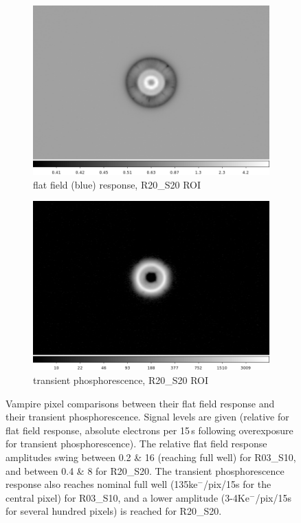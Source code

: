 \begin{figure}[!htbp]
\begin{subfigure}{0.45\textwidth}
    \includegraphics[width=\textwidth]{figures/phosphorescence-survey/vamp_comp_R20_S20_flatresp.png}
     \caption{flat field (blue) response, R20\_S20 ROI}
     \label{subfig:flatresp_R20_S20}
\end{subfigure}
\begin{subfigure}{0.45\textwidth}
    \includegraphics[width=\textwidth]{figures/phosphorescence-survey/vamp_comp_R20_S20_phosresp.png}
     \caption{transient phosphorescence, R20\_S20 ROI}
     \label{subfig:phosresp_R20_S20}
\end{subfigure}
\newline
\caption{Vampire pixel comparisons between their flat field response and their transient phosphorescence. Signal levels are given (relative for flat field response, absolute electrons per 15\,s following overexposure for transient phosphorescence). The relative flat field response amplitudes swing between 0.2 \& 16 (reaching full well) for R03\_S10, and between 0.4 \& 8 for R20\_S20. The transient phosphorescence response also reaches nominal full well (135ke$^-$/pix/15s for the central pixel) for R03\_S10, and a lower amplitude (3-4Ke$^-$/pix/15s for several hundred pixels) is reached for R20\_S20.}
\label{fig:vamp-phos:R03_S10-R20_S20}
\end{figure}

